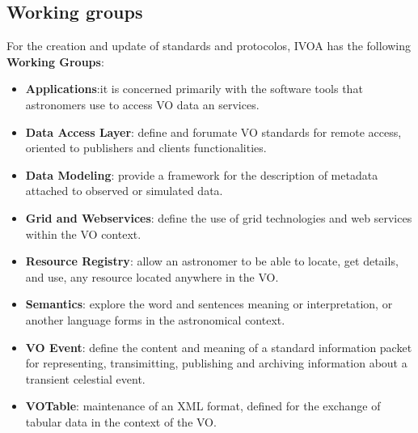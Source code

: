 \subsection{Working groups}

For the creation and update of standards and protocolos, IVOA has the
following \textbf{Working Groups}:
\begin{itemize}
\item \textbf{Applications}:it is concerned primarily with the software
	tools that astronomers use to access VO data an services.
\item \textbf{Data Access Layer}: define and forumate VO standards for
	remote access, oriented to publishers and clients functionalities.
\item \textbf{Data Modeling}: provide a framework for the description
	of metadata attached to observed or simulated data.
\item \textbf{Grid and Webservices}: define the use of grid technologies
	and web services within the VO context.
\item \textbf{Resource Registry}: allow an astronomer to be
	able to locate,	get details, and use, any resource located 
	anywhere in the VO.
\item \textbf{Semantics}: explore the word  and sentences
	meaning or interpretation, or another language forms in the
	astronomical context.
\item \textbf{VO Event}: define the content and meaning of a
	standard information packet for representing, transimitting, 
	publishing and archiving information about a transient celestial event.
\item \textbf{VOTable}: maintenance of an XML format, defined
	for the exchange of tabular data in the context of the VO.






\end{itemize}
